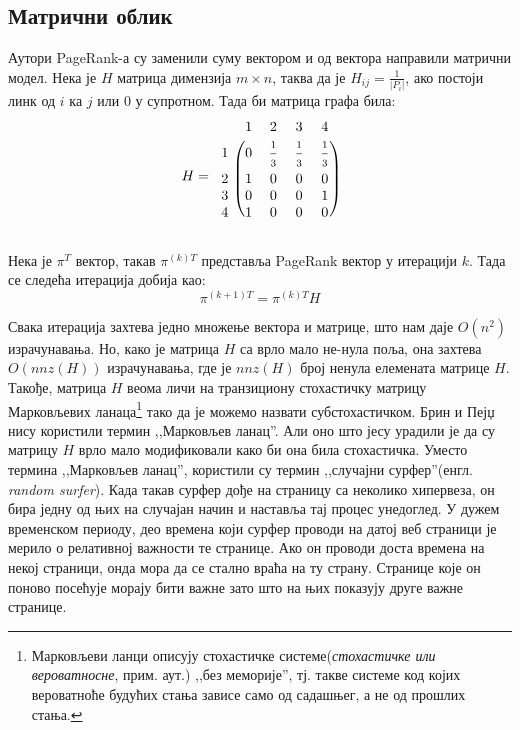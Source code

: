 \subsection{Матрични облик}
Аутори  PageRank-а су заменили суму вектором и од вектора направили матрични модел. Нека је $H$ матрица димензија $m\times n$, таква да је $H_{ij}=\frac{1}{\left |P_{i}  \right |}$, ако постоји линк од $i$ ка $j$ или $0$ у супротном. Тада би матрица графа била:
\[
H=
\begin{blockarray}{ccccc}
& 1 & 2 & 3 & 4  \\
\begin{block}{c(cccc)}
  1 & 0 & \frac{\strut 1}{\strut 3} & \frac{\strut 1}{\strut 3} & \frac{\strut 1}{\strut 3}  \\
  2 & 1 & 0 & 0 & 0  \\
  3 & 0 & 0 & 0 & 1  \\
  4 & 1 & 0 & 0 & 0  \\
\end{block}
\end{blockarray}
 \]

Нека је $\pi^{T}$ вектор, такав $\pi^{(k)T}$ представља PageRank вектор у итерацији $k$. Тада се следећа итерација добија као:
\begin{equation}
\pi^{(k+1) T}=\pi^{(k)T}H
\end{equation}

Свака итерација захтева једно множење вектора и матрице, што нам даје $O(n^{2})$ израчунавања. Но, како је матрица $H$ са врло мало не-нула поља, она захтева $O(nnz(H))$ израчунавања, где је $nnz(H)$ број ненула елемената матрице $H$. Такође, матрица $H$ веома личи на транзициону стохастичку матрицу Марковљевих ланаца\footnote{Марковљеви ланци описују стохастичке системе(\emph{стохастичке или вероватносне}, прим. аут.) ,,без меморије'', тј. такве системе код којих вероватноће будућих стања зависе само од садашњег, а не од прошлих стања.\cite{filipovic2006operatori}} тако да је можемо назвати субстохастичком\cite[Ch 4.2]{langville2011google}. Брин и Пејџ нису користили термин ,,Марковљев ланац''. Али оно што јесу урадили је да су матрицу $H$ врло мало модификовали како би она била стохастичка. Уместо термина ,,Марковљев ланац'', користили су термин ,,случајни сурфер''(енгл. \emph{random surfer}). Када такав сурфер дође на страницу са неколико хипервеза, он бира једну од њих на случајан начин и наставља тај процес унедоглед. У дужем временском периоду, део времена који сурфер проводи на датој веб страници је мерило о релативној важности те странице. Ако он проводи доста времена на некој страници, онда мора да се стално враћа на ту страну. Странице које он поново посећује морају бити важне зато што на њих показују друге важне странице.

